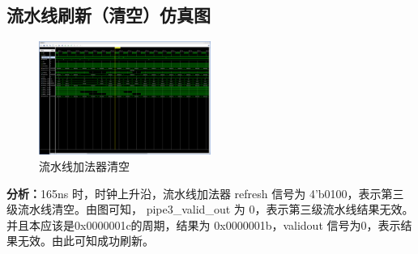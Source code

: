 \subsection{流水线刷新（清空）仿真图}
\begin{figure}[htbp]
    \centering
    \includegraphics[width=0.5\textwidth]{image/33.png}
    \caption{流水线加法器清空}
    \label{fig:my_label}
\end{figure}
\textbf{分析：}165ns 时，时钟上升沿，流水线加法器 refresh 信号为 4'b0100，表示第三级流水线清空。由图可知， pipe3\_valid\_out 为 0，表示第三级流水线结果无效。并且本应该是0x0000001c的周期，结果为 0x0000001b，validout 信号为0，表示结果无效。由此可知成功刷新。